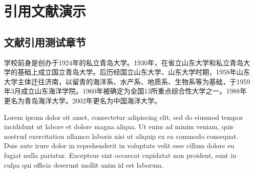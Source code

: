 \chapter{引用文献演示}

\section{文献引用测试章节}

学校前身是创办于1924年的私立青岛大学\cite{wc24arfm}。1930年，在省立山东大学和私立青岛大学的基础上成立国立青岛大学。后历经国立山东大学、山东大学时期\cite{zz19nc}，1958年山东大学主体迁往济南\cite{lj15hyxb}，以留青的海洋系、水产系、地质系、生物系等为基础，于1959年3月成立山东海洋学院。1960年被确定为全国13所重点综合性大学之一。1988年更名为青岛海洋大学。2002年更名为中国海洋大学。

Lorem ipsum dolor sit amet\cite{kj25tvcg}, consectetur adipiscing elit, sed do eiusmod tempor incididunt ut labore et dolore magna aliqua\cite{lcy24tgrs}. Ut enim ad minim veniam, quis nostrud exercitation ullamco laboris nisi ut aliquip ex ea commodo consequat. Duis aute irure dolor in reprehenderit in voluptate velit esse cillum dolore eu fugiat nulla pariatur. Excepteur sint occaecat cupidatat non proident, sunt in culpa qui officia deserunt mollit anim id est laborum.